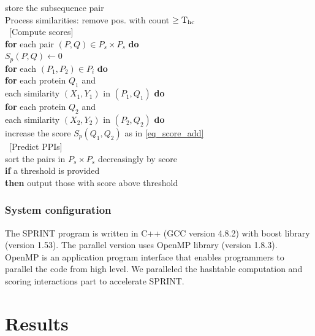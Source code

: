 \ccc  \qqf {} store the subsequence pair \\
\ccc Process similarities: remove pos. with count $\ge\operatorname{T_{\rm hc}}$ \\
\   [Compute scores]   \\
\ccc  \textbf{for} each pair $(P,Q) \in P_s\times P_s$ \textbf{do}\\
\ccc  \qqa $S_p(P,Q) \gets 0$\\
\ccc  \textbf{for} each $(P_1,P_2)\in P_i$ \textbf{do}   \\
\ccc  \qqa \textbf{for} each protein $Q_1$ and \\
\qqd each similarity $(X_1,Y_1)$ in $(P_1,Q_1)$ \textbf{do}   \\
\ccc  \qqb \textbf{for} each protein $Q_2$ and \\
\qqe each similarity $(X_2,Y_2)$ in $(P_2,Q_2)$ \textbf{do}   \\
\ccc  \qqc increase the score $S_p(Q_1,Q_2)$ as in \eqref{eq_score_add}   \\
\   [Predict PPIs]\\
\ccc  sort the pairs in $P_s\times P_s$ decreasingly by score   \\
\ccc  \textbf{if} a threshold is provided  \\
\ccc  \qqa \textbf{then} output those with score above threshold   \\






\subsubsection{System configuration}
The SPRINT program is written in C++ (GCC version 4.8.2) with boost library (version 1.53). The parallel version uses OpenMP library (version 1.8.3). OpenMP is an application program interface that enables programmers to parallel the code from high level. We paralleled the hashtable computation and scoring interactions part to accelerate SPRINT.

\section{Results}
